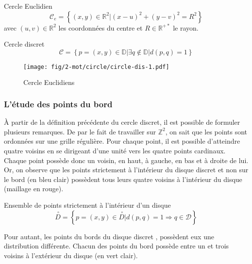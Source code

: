\begin{Definition}{Cercle Euclidien}
\label{def:cer-euc}
  $$\mathcal{C}_e =  \left\{ (x,y) \in \mathbb{R}^{2} |  (x - u)^2 + (y - v)^2 = R^2 \right\}$$
  avec $(u,v) \in \mathbb{R}^{2}$ les coordonnées du centre et $R \in \mathbb{R}^{+*}$ le rayon.\\
\end{Definition}

\begin{Definition}{Cercle discret}
\label{def:cer-dis}
  $$ \mathcal{C} =  \left\{ p=(x,y) \in \mathbb{D} | \exists q \notin \mathbb{D} | d(p, q) = 1  \right\}$$
\end{Definition}

\begin{figure}[H]
  \centering
  \texttt{[image: fig/2-mot/circle/circle-dis-1.pdf]}
  \caption{Cercle Euclidiens}
\end{figure}


\subsubsection{L'étude des points du bord}

À partir de la définition précédente du cercle discret, il est possible de formuler plusieurs remarques. De par le fait de travailler sur $\mathbb{Z}^{2}$, on sait que les points sont ordonnées sur une grille régulière. Pour chaque point, il est possible d'atteindre quatre voisins en se dirigeant d'une unité vers les quatre points cardinaux. Chaque point possède donc un voisin, en haut, à gauche, en bas et à droite de lui. Or, on observe que les points strictement à l'intérieur du disque discret et non sur le bord (en bleu clair) possèdent tous leurs quatre voisins à l'intérieur du disque (maillage en rouge).

\begin{Definition}{Ensemble de points strictement à l'intérieur d'un disque}
\label{def:cer-dis}
  $$ \stackrel{\ \circ}{D} =  \left\{ p=(x,y) \in \stackrel{\ \circ}{D} | d(p, q) = 1 \Rightarrow q \in \mathcal{D} \right\}$$
\end{Definition}

Pour autant, les points du bords du disque discret , possèdent eux une distribution différente. Chacun des points du bord possède entre un et trois voisins à l'extérieur du disque (en vert clair).

